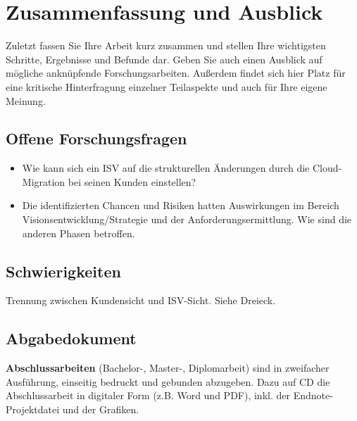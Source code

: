 \section{Zusammenfassung und Ausblick}
\label{cha:fazit}
Zuletzt fassen Sie Ihre Arbeit kurz zusammen und stellen Ihre wichtigsten Schritte, Ergebnisse und Befunde dar. Geben Sie auch einen Ausblick auf mögliche anknüpfende Forschungsarbeiten. Außerdem findet sich hier Platz für eine kritische Hinterfragung einzelner Teilaspekte und auch für Ihre eigene Meinung.

\subsection{Offene Forschungsfragen}
\begin{itemize}
	\item Wie kann sich ein ISV auf die strukturellen Änderungen durch die 
Cloud-Migration bei seinen Kunden einstellen?
	\item Die identifizierten Chancen und Risiken hatten Auswirkungen im 
Bereich Visionsentwicklung/Strategie und der Anforderungsermittlung. Wie sind 
die anderen Phasen betroffen.
\end{itemize}

\subsection{Schwierigkeiten}
Trennung zwischen Kundensicht und ISV-Sicht. Siehe Dreieck.




\subsection{Abgabedokument}
\textbf{Abschlussarbeiten} (Bachelor-, Master-, Diplomarbeit) sind in zweifacher 
Ausführung, einseitig bedruckt und gebunden abzugeben. Dazu auf CD die 
Abschlussarbeit in digitaler Form (z.B. Word und PDF), inkl. der 
Endnote-Projektdatei und der Grafiken. 
